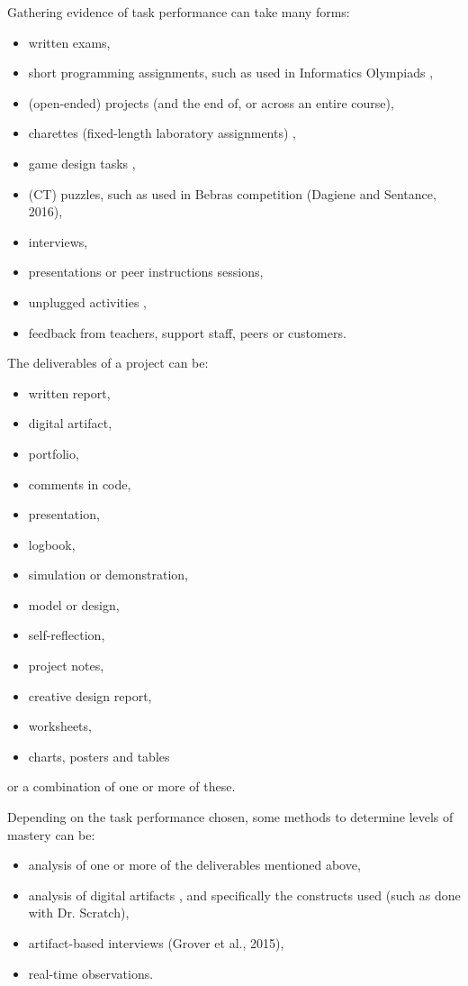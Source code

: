 

Gathering evidence of task performance can take many forms:
\begin{itemize}
\item written exams,
\item short programming assignments, such as used in Informatics Olympiads \cite{Lonati2017Bebras},
\item (open-ended) projects (and the end of, or across an entire course),
\item charettes (fixed-length laboratory assignments) \cite{McCracken2001},
\item game design tasks \cite{snow2017CTECD},
\item (CT) puzzles, such as used in Bebras competition (Dagiene and Sentance, 2016),
\item interviews,
\item presentations or peer instructions sessions,
\item unplugged activities \cite{rodriguez2017assessingCTunplugged},
\item feedback from teachers, support staff, peers or customers.
\end{itemize}


The deliverables of a project can be:
\begin{itemize}
\item written report,
\item digital artifact,
\item portfolio,
\item comments in code,
\item presentation,
\item logbook,
\item simulation or demonstration,
\item model or design,
\item self-reflection,
\item project notes,
\item creative design report,
\item worksheets,
\item charts, posters and tables
\end{itemize}
or a combination of one or more of these.


Depending on the task performance chosen, some methods to determine levels of mastery can be:
\begin{itemize}
\item analysis of one or more of the deliverables mentioned above, 
\item analysis of digital artifacts \cite{BrennanResnick2012} , and specifically the constructs used (such as done with Dr. Scratch),
\item artifact-based interviews (Grover et al., 2015),
\item real-time observations.
\end{itemize}


